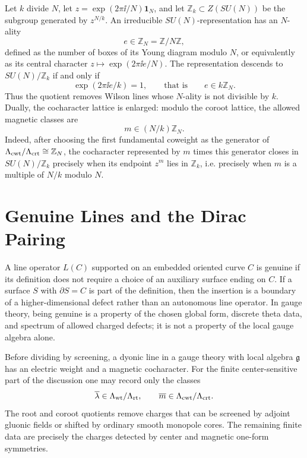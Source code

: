 \begin{example}[\(SU(N)/\mathbb Z_k\)]
\label{ex:su-n-z-k-descent}
Let \(k\) divide \(N\), let \(z=\exp(2\pi\ii/N)\mathbf 1_N\), and let
\(\mathbb Z_k\subset Z(SU(N))\) be the subgroup generated by \(z^{N/k}\).
An irreducible \(SU(N)\)-representation has an \(N\)-ality
\[
  e\in\mathbb Z_N=\mathbb Z/N\mathbb Z,
\]
defined as the number of boxes of its Young diagram modulo \(N\), or
equivalently as its central character
\(z\mapsto\exp(2\pi\ii e/N)\).  The representation descends to
\(SU(N)/\mathbb Z_k\) if and only if
\[
  \exp(2\pi\ii e/k)=1,
  \qquad\text{that is}\qquad
  e\in k\mathbb Z_N .
\]
Thus the quotient removes Wilson lines whose \(N\)-ality is not divisible by
\(k\).  Dually, the cocharacter lattice is enlarged: modulo the coroot
lattice, the allowed magnetic classes are
\[
  m\in (N/k)\mathbb Z_N .
\]
Indeed, after choosing the first fundamental coweight as the generator of
\(\Lambda_{\rm cwt}/\Lambda_{\rm crt}\cong\mathbb Z_N\), the cocharacter
represented by \(m\) times this generator closes in \(SU(N)/\mathbb Z_k\)
precisely when its endpoint \(z^m\) lies in \(\mathbb Z_k\), i.e. precisely
when \(m\) is a multiple of \(N/k\) modulo \(N\).
\end{example}

\section{Genuine Lines and the Dirac Pairing}

\begin{definition}
\label{def:genuine-line-operator}
A line operator \(L(C)\) supported on an embedded oriented curve \(C\) is
genuine if its definition does not require a choice of an auxiliary surface
ending on \(C\).  If a surface \(S\) with \(\partial S=C\) is part of the
definition, then the insertion is a boundary of a higher-dimensional defect
rather than an autonomous line operator.  In gauge theory, being genuine is a
property of the chosen global form, discrete theta data, and spectrum of
allowed charged defects; it is not a property of the local gauge algebra
alone.
\end{definition}

Before dividing by screening, a dyonic line in a gauge theory with local
algebra \(\mathfrak g\) has an electric weight and a magnetic cocharacter.
For the finite center-sensitive part of the discussion one may record only
the classes
\[
  \overline\lambda\in\Lambda_{\rm wt}/\Lambda_{\rm rt},
  \qquad
  \overline m\in\Lambda_{\rm cwt}/\Lambda_{\rm crt}.
\]
The root and coroot quotients remove charges that can be screened by adjoint
gluonic fields or shifted by ordinary smooth monopole cores.  The remaining
finite data are precisely the charges detected by center and magnetic
one-form symmetries.

